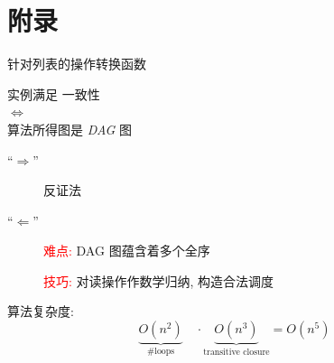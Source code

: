 
\section{附录}

\appendix




\begin{frame}{}
  \centerline{\large 针对列表的操作转换函数~}

  \resizebox{\textwidth}{!}{
    \begin{minipage}{\textwidth}
      
    \end{minipage}
  }
\end{frame}


\begin{frame}{}
  \begin{ctheorem}
    \begin{center}
      \emph{} 实例满足 \emph{\PRAM{}} 一致性 \\[5pt]
      $\iff$ \\[5pt]
      \rwclosure{} 算法所得图是 \emph{DAG} 图
    \end{center}
  \end{ctheorem}

  \pause
  \vspace{0.20cm}

  \begin{cproof}
    \begin{description}
      \item[``$\Longrightarrow$''] 反证法
      \item[``$\Longleftarrow$''] 
	\textcolor{red}{难点:} DAG 图蕴含着多个全序

	\textcolor{red}{技巧:} 对读操作作数学归纳, 构造合法调度
    \end{description}
  \end{cproof}

  \pause
  \vspace{0.30cm}

  \rwclosure{} 算法复杂度: 
  \[
    \underbrace{O(n^2)}_{\textrm{\#loops}} \quad\cdot
	\underbrace{O(n^3)}_{\textrm{transitive closure}}  = O(n^5)
  \]
\end{frame}

